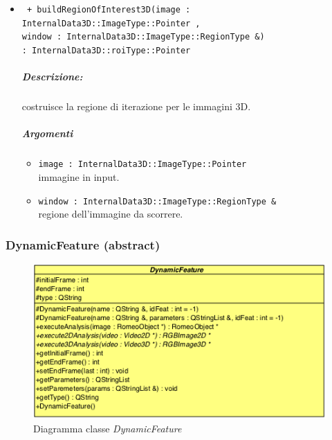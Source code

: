 \begin{itemize}
	\item \color{blue}\verb! + buildRegionOfInterest3D(image : InternalData3D::ImageType::Pointer , !\\																	\verb!window : InternalData3D::ImageType::RegionType &) !\\
													\verb!: InternalData3D::roiType::Pointer  !					
		\color{black}
		\subparagraph{Descrizione:} costruisce la regione di iterazione per le immagini 3D.
		\subparagraph{Argomenti}
			\begin{itemize}
				\item \color{RoyalPurple} \verb!image : InternalData3D::ImageType::Pointer ! \\ 
				\color{black} immagine in input.		
			\end{itemize}
			\begin{itemize}
				\item \color{RoyalPurple} \verb!window : InternalData3D::ImageType::RegionType & ! \\ 
				\color{black} regione dell'immagine da scorrere.		
			\end{itemize}
		
	\end{itemize}

\color{black}
\pagebreak
\subsubsection{DynamicFeature (abstract)}
\label{DynamicFeature}
\begin{figure}[!h]
\centering
			\includegraphics[scale=1]{./Content/Immagini/modelCore/DynamicFeature.png}
			\caption{Diagramma classe \textsl{DynamicFeature}}
			\label{Dynamic_img}
\end{figure}

